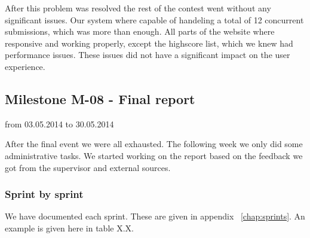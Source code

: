 After this problem was resolved the rest of the contest went without any
significant issues. Our system where capable of handeling a total of 12
concurrent submissions, which was more than enough. All parts of the website where
responsive and working properly, except the highscore list, which we
knew had performance issues. These issues did not have a significant
impact on the user experience.

\subsection{Milestone M-08 - Final report}
\label{sec:M08}
from 03.05.2014 to 30.05.2014

After the final event we were all exhausted. The following week we only
did some administrative tasks. We started working on the report based on 
the feedback we got from the supervisor and external sources. 

\subsubsection{Sprint by sprint}
We have documented each sprint. These are given in appendix
~\ref{chap:sprints}. An example is given here in table X.X.
